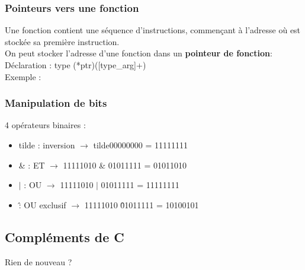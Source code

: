\documentclass{article}
\newcommand{\insertslide}[2]{
\begin{center}
    \fbox{\texttt{[image: \#1]}}
\end{center}
}
\begin{document}
        \subsubsection{Pointeurs vers une fonction}
            Une fonction contient une séquence d'instructions, commençant à l'adresse
            où est stockée sa première instruction.\\
            On peut stocker l'adresse d'une fonction dans un \textbf{pointeur de fonction}:\\
            Déclaration : type (*ptr)([type\_arg]+)\\
            Exemple :
            \insertslide{Slides/CM2.pdf}{50}
        
        \subsubsection{Manipulation de bits}
            4 opérateurs binaires :
            \begin{itemize}
                \item tilde : inversion $\rightarrow$ tilde00000000 = 11111111
                \item \& : ET $\rightarrow$ 11111010 \& 01011111 = 01011010
                \item $|$ : OU $\rightarrow$ 11111010 $|$ 01011111 = 11111111
                \item \^ : OU exclusif $\rightarrow$ 11111010 \^ 01011111 = 10100101
            \end{itemize}

    \subsection{Compléments de C}
        Rien de nouveau ?
\end{document}
